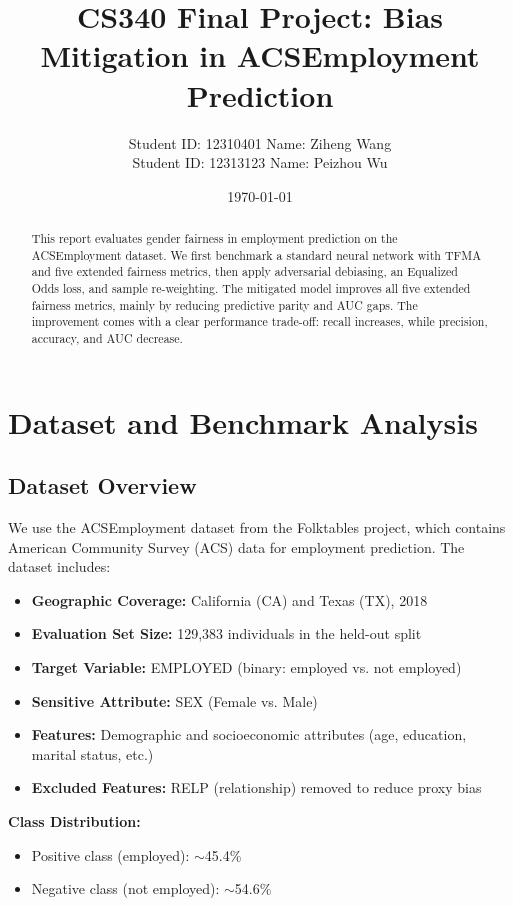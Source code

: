 \documentclass[11pt,a4paper]{article}
\title{CS340 Final Project: Bias Mitigation in ACSEmployment Prediction}
\author{Student ID: 12310401 \quad Name: Ziheng Wang \\ Student ID: 12313123 \quad Name: Peizhou Wu}
\date{\today}
\begin{document}
\maketitle

\begin{abstract}
This report evaluates gender fairness in employment prediction on the ACSEmployment dataset. We first benchmark a standard neural network with TFMA and five extended fairness metrics, then apply adversarial debiasing, an Equalized Odds loss, and sample re-weighting. The mitigated model improves all five extended fairness metrics, mainly by reducing predictive parity and AUC gaps. The improvement comes with a clear performance trade-off: recall increases, while precision, accuracy, and AUC decrease.
\end{abstract}

\section{Dataset and Benchmark Analysis}
\label{sec:benchmark}

\subsection{Dataset Overview}

We use the ACSEmployment dataset from the Folktables project, which contains American Community Survey (ACS) data for employment prediction. The dataset includes:

\begin{itemize}
    \item \textbf{Geographic Coverage:} California (CA) and Texas (TX), 2018
    \item \textbf{Evaluation Set Size:} 129,383 individuals in the held-out split
    \item \textbf{Target Variable:} EMPLOYED (binary: employed vs. not employed)
    \item \textbf{Sensitive Attribute:} SEX (Female vs. Male)
    \item \textbf{Features:} Demographic and socioeconomic attributes (age, education, marital status, etc.)
    \item \textbf{Excluded Features:} RELP (relationship) removed to reduce proxy bias
\end{itemize}

\textbf{Class Distribution:}
\begin{itemize}
    \item Positive class (employed): $\sim$45.4\%
    \item Negative class (not employed): $\sim$54.6\%
\end{itemize}
\end{document}
